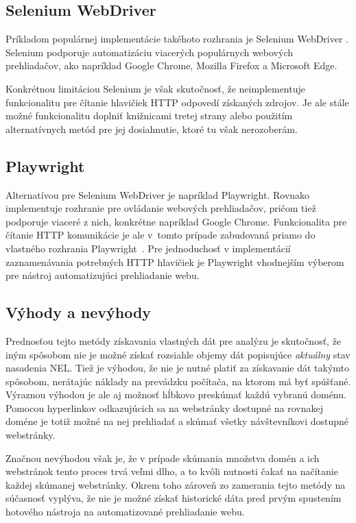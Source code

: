 \subsection{Selenium WebDriver}

Príkladom populárnej implementácie takéhoto rozhrania je Selenium WebDriver \cite{crawling-selenium}.
Selenium podporuje automatizáciu viacerých populárnych webových prehliadačov, ako napríklad Google Chrome, Mozilla Firefox a Microsoft Edge.

Konkrétnou limitáciou Selenium je však skutočnosť, že neimplementuje funkcionalitu pre čítanie hlavičiek HTTP odpovedí získaných zdrojov.
Je ale stále možné funkcionalitu doplniť knižnicami tretej strany alebo použitím alternatívnych metód pre jej dosiahnutie, ktoré tu však nerozoberám.

\subsection{Playwright}

Alternatívou pre Selenium WebDriver je napríklad Playwright.
Rovnako implementuje rozhranie pre ovládanie webových prehliadačov,
pričom tiež podporuje viaceré z nich, konkrétne napríklad Google Chrome.
Funkcionalita pre čítanie HTTP komunikácie je ale \mbox{v tomto} prípade zabudovaná priamo do vlastného rozhrania \mbox{Playwright \cite{crawling-playwright}}.
Pre jednoduchosť v implementácií zaznamenávania potrebných HTTP hlavičiek je Playwright vhodnejším výberom pre nástroj automatizujúci prehliadanie webu.

\subsection{Výhody a nevýhody}

Prednosťou tejto metódy získavania vlastných dát pre analýzu je skutočnosť, že iným spôsobom nie je možné získať rozsiahle objemy dát popisujúce \textit{aktuálny} stav nasadenia NEL.
Tiež je výhodou, že nie je nutné platiť za získavanie dát takýmto spôsobom, nerátajúc náklady na prevádzku počítača, na ktorom má byť spúšťané.
Výraznou výhodou je ale aj možnosť hĺbkovo preskúmať každú vybranú doménu.
Pomocou hyperlinkov odkazujúcich sa na webstránky dostupné na rovnakej doméne je totiž možné na nej prehliadať a skúmať všetky návštevníkovi dostupné webstránky.

Značnou nevýhodou však je, že v prípade skúmania množstva domén a ich webstránok tento proces trvá veľmi dlho, a to kvôli nutnosti čakať na načítanie každej skúmanej webstránky. 
Okrem toho zároveň zo zamerania tejto metódy na súčasnosť vyplýva, že nie je možné získať historické dáta pred prvým spustením hotového nástroja na automatizované prehliadanie webu.  

